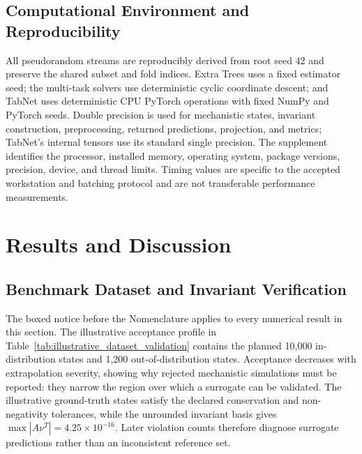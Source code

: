 \documentclass[a4paper,fleqn]{cas-sc}
\begin{document}
\subsection{Computational Environment and Reproducibility}

All pseudorandom streams are reproducibly derived from root seed 42 and preserve the shared subset and fold indices. Extra Trees uses a fixed estimator seed; the multi-task solvers use deterministic cyclic coordinate descent; and TabNet uses deterministic CPU PyTorch operations with fixed NumPy and PyTorch seeds. Double precision is used for mechanistic states, invariant construction, preprocessing, returned predictions, projection, and metrics; TabNet's internal tensors use its standard single precision. The supplement identifies the processor, installed memory, operating system, package versions, precision, device, and thread limits. Timing values are specific to the accepted workstation and batching protocol and are not transferable performance measurements.

\section{Results and Discussion}

\subsection{Benchmark Dataset and Invariant Verification}

The boxed notice before the Nomenclature applies to every numerical result in this section. The illustrative acceptance profile in Table~\ref{tab:illustrative_dataset_validation} contains the planned 10,000 in-distribution states and 1,200 out-of-distribution states. Acceptance decreases with extrapolation severity, showing why rejected mechanistic simulations must be reported: they narrow the region over which a surrogate can be validated. The illustrative ground-truth states satisfy the declared conservation and non-negativity tolerances, while the unrounded invariant basis gives $\max|A\nu^T|=4.25\times10^{-16}$. Later violation counts therefore diagnose surrogate predictions rather than an inconsistent reference set.
\end{document}
